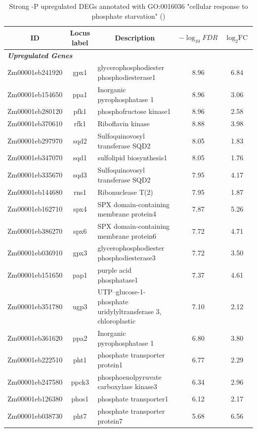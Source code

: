 \documentclass[9pt,twocolumn,twoside]{rilabRxiv}
\begin{document}
\begin{table}[h!]
\centering
\footnotesize
\caption{Strong -P upregulated DEGs annotated with GO:0016036 "cellular response to phosphate starvation" (\cite{fattel2024})}
\label{table::PSRupDEGs}
\begin{tabular}{ccp{7.5cm}cc}
\hline
\textbf{ID} & \textbf{Locus label} & \multicolumn{1}{c}{\textbf{Description}} & \textbf{$-\log_{10}{\textit{FDR}}$} & \textbf{$\log_2{\text{FC}}$}\\
\hline
\multicolumn{5}{l}{\textit{\textbf{Upregulated Genes}}} \\
\hline
Zm00001eb241920 & gpx1 & glycerophosphodiester phosphodiesterase1 & 8.96 & 6.84\\
Zm00001eb154650 & ppa1 & Inorganic pyrophosphatase 1 & 8.96 & 3.06\\
Zm00001eb280120 & pfk1 & phosphofructose kinase1 & 8.96 & 2.58\\
Zm00001eb370610 & rfk1 & Riboflavin kinase & 8.88 & 3.98\\
Zm00001eb297970 & sqd2 & Sulfoquinovosyl transferase SQD2 & 8.05 & 1.83\\
Zm00001eb347070 & sqd1 & sulfolipid biosynthesis1 & 8.05 & 1.76\\
Zm00001eb335670 & sqd3 & Sulfoquinovosyl transferase SQD2 & 7.95 & 4.17\\
Zm00001eb144680 & rns1 & Ribonuclease T(2) & 7.95 & 1.87\\
Zm00001eb162710 & spx4 & SPX domain-containing membrane protein4 & 7.87 & 5.26\\
Zm00001eb386270 & spx6 & SPX domain-containing membrane protein6 & 7.72 & 4.71\\
Zm00001eb036910 & gpx3 & glycerophosphodiester phosphodiesterase3 & 7.72 & 3.50\\
Zm00001eb151650 & pap1 & purple acid phosphatase1 & 7.37 & 4.61\\
Zm00001eb351780 & ugp3 & UTP--glucose-1-phosphate uridylyltransferase 3, chloroplastic & 7.10 & 2.12\\
Zm00001eb361620 & ppa2 & Inorganic pyrophosphatase 1 & 6.80 & 3.80\\
Zm00001eb222510 & pht1 & phosphate transporter protein1 & 6.77 & 2.29\\
Zm00001eb247580 & ppck3 & phosphoenolpyruvate carboxylase kinase3 & 6.34 & 2.96\\
Zm00001eb126380 & phos1 & phosphate transporter1 & 6.12 & 2.17\\
Zm00001eb038730 & pht7 & phosphate transporter protein7 & 5.68 & 6.56\\

\end{tabular}
\end{table}
\end{document}
